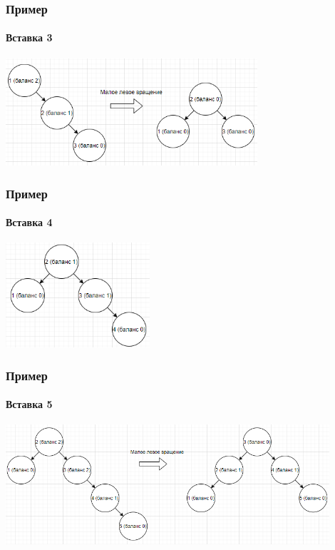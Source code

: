 \documentclass{../../slides-style}
\begin{document}
    \begin{frame}
        \frametitle{Пример}
        \framesubtitle{Вставка 3}
        \begin{center}
            \includegraphics[width=0.7\textwidth]{avl3.png}
        \end{center}
    \end{frame}

    \begin{frame}
        \frametitle{Пример}
        \framesubtitle{Вставка 4}
        \begin{center}
            \includegraphics[width=0.4\textwidth]{avl4.png}
        \end{center}
    \end{frame}

    \begin{frame}
        \frametitle{Пример}
        \framesubtitle{Вставка 5}
        \begin{center}
            \includegraphics[width=0.9\textwidth]{avl5.png}
        \end{center}
    \end{frame}
\end{document}
